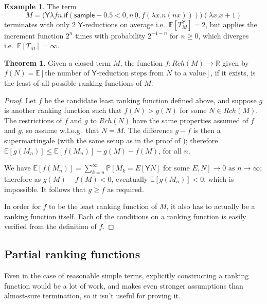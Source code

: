 \documentclass{article}
\newcommand\expect[1]{\mathbb{E}[#1]}
\newcommand{\tY}{\mathsf{Y}}
\newcommand{\tif}[3]{\mathsf{if}(#1, #2, #3)} %
\newcommand{\tsample}{\mathsf{sample}}
\theoremstyle{definition}
\newtheorem{example}{Example}
\theoremstyle{lemma}
\newtheorem{theorem}{Theorem}
\theoremstyle{remark}
\begin{document}
\begin{example}
\label{ex:tY finite does not imply t finite}
The term
\[
M = \big(\tY \lambda f n. \tif{\tsample - 0.5 < 0}{n \, \underline 0}{f (\lambda x. n (n x))}\big) (\lambda x. x+1)
\] 
terminates with only 2 $\tY$-reductions on average i.e.~$\expect{T_M^\tY} = 2$, but applies the increment function $2^n$ times with probability $2^{-1-n}$ for $n \geq 0$, which diverges i.e.~$\expect{T_M} = \infty$.
\end{example}

\begin{theorem} \label{thm:minimal}
Given a closed term $M$, the function $f:Rch(M) \to \mathbb R$ given by $f(N) = \mathbb E [\text{the number of }\tY\text{-reduction steps from }N\text{ to a value}]$, if it exists, is the least of all possible ranking functions of $M$.
\end{theorem}
\begin{proof}
Let $f$ be the candidate least ranking function defined above, and suppose $g$ is another ranking function such that $f(N) > g(N)$ for some $N \in Rch(M)$. The restrictions of $f$ and $g$ to $Rch(N)$ have the same properties assumed of $f$ and $g$, so assume w.l.o.g.~that $N=M$. The difference $g - f$ is then a supermartingale (with the same setup as in the proof of %
);
therefore $\mathbb E[g(M_n)] \leq \mathbb E[f(M_n)] + g(M)-f(M)$, for all $n$.

We have $\mathbb E[f(M_n)] = \sum_{k=n}^\infty \mathbb P[M_k = E[\tY N] \text{ for some }E, N] \to 0 \text{ as } n \to \infty$; 
therefore as $g(M) - f(M) < 0$, eventually $\mathbb E[g(M_n)] < 0$, which is impossible. 
It follows that $g \geq f$ as required.

In order for $f$ to be the least ranking function of $M$, it also has to actually be a ranking function itself. Each of the conditions on a ranking function is easily verified from the definition of $f$.
\end{proof}

\subsection{Partial ranking functions}
Even in the case of reasonable simple terms, explicitly constructing a ranking function would be a lot of work, and  makes even stronger assumptions than almost-sure termination, so it isn't useful for proving it. 
\end{document}
